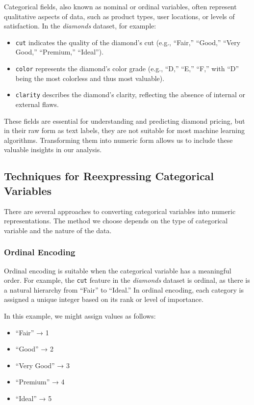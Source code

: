 \documentclass[
  11pt,
]{book}
\providecommand{\tightlist}{%
  \setlength{\itemsep}{0pt}\setlength{\parskip}{0pt}}
\theoremstyle{definition}
\theoremstyle{definition}
\theoremstyle{definition}
\theoremstyle{definition}
\theoremstyle{remark}
\begin{document}
Categorical fields, also known as nominal or ordinal variables, often represent qualitative aspects of data, such as product types, user locations, or levels of satisfaction. In the \emph{diamonds} dataset, for example:

\begin{itemize}
\tightlist
\item
  \texttt{cut} indicates the quality of the diamond's cut (e.g., ``Fair,'' ``Good,'' ``Very Good,'' ``Premium,'' ``Ideal'').
\item
  \texttt{color} represents the diamond's color grade (e.g., ``D,'' ``E,'' ``F,'' with ``D'' being the most colorless and thus most valuable).
\item
  \texttt{clarity} describes the diamond's clarity, reflecting the absence of internal or external flaws.
\end{itemize}

These fields are essential for understanding and predicting diamond pricing, but in their raw form as text labels, they are not suitable for most machine learning algorithms. Transforming them into numeric form allows us to include these valuable insights in our analysis.

\subsection{Techniques for Reexpressing Categorical Variables}\label{techniques-for-reexpressing-categorical-variables}

There are several approaches to converting categorical variables into numeric representations. The method we choose depends on the type of categorical variable and the nature of the data.

\subsubsection*{Ordinal Encoding}\label{ordinal-encoding}


Ordinal encoding is suitable when the categorical variable has a meaningful order. For example, the \texttt{cut} feature in the \emph{diamonds} dataset is ordinal, as there is a natural hierarchy from ``Fair'' to ``Ideal.'' In ordinal encoding, each category is assigned a unique integer based on its rank or level of importance.

In this example, we might assign values as follows:

\begin{itemize}
\tightlist
\item
  ``Fair'' → 1
\item
  ``Good'' → 2
\item
  ``Very Good'' → 3
\item
  ``Premium'' → 4
\item
  ``Ideal'' → 5
\end{itemize}
\end{document}
